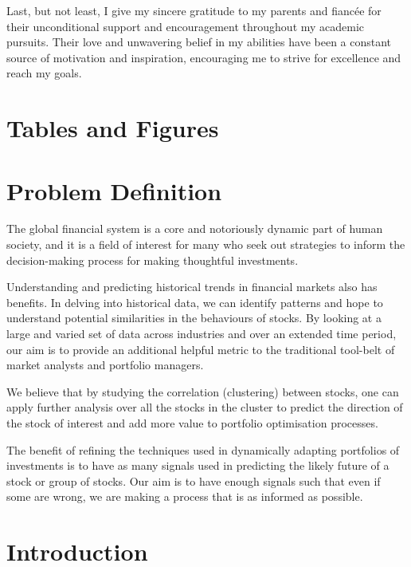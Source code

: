 \documentclass[11pt]{article}
\begin{document}
 Last, but not least, I give my sincere gratitude to my parents and fiancée for their unconditional support and encouragement throughout my academic pursuits. Their love and unwavering belief in my abilities have been a constant source of motivation and inspiration, encouraging me to strive for excellence and reach my goals.
\newpage

\tableofcontents

\newpage

\section{Tables and Figures}

\listoftables

\listoffigures

\newpage

\section{Problem Definition}

The global financial system is a core and notoriously dynamic part of human society, and it is a field of interest for many who seek out strategies to inform the decision-making process for making thoughtful investments. 

Understanding and predicting historical trends in financial markets also has benefits. In delving into historical data, we can identify patterns and hope to understand potential similarities in the behaviours of stocks. By looking at a large and varied set of data across industries and over an extended time period, our aim is to provide an additional helpful metric to the traditional tool-belt of market analysts and portfolio managers. 

We believe that by studying the correlation (clustering) between stocks, one can apply further analysis over all the stocks in the cluster to predict the direction of the stock of interest and add more value to portfolio optimisation processes. 

The benefit of refining the techniques used in dynamically adapting portfolios of investments is to have as many signals used in predicting the likely future of a stock or group of stocks. Our aim is to have enough signals such that even if some are wrong, we are making a process that is as informed as possible.


\section{Introduction}
\end{document}

